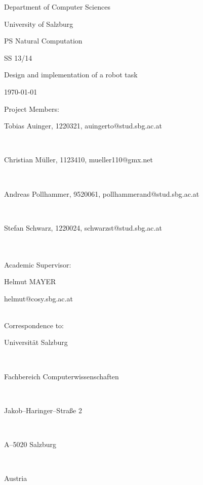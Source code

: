 \documentclass[12pt,fleqn,a4paper]{article}
\begin{document}
\begin{titlepage}%
\vspace{2cm}
\centerline{
\large{Department of Computer Sciences}}
\vspace{0.2cm}
\centerline{\large{University of Salzburg}}%
\vspace{2cm}

\centerline{\large{PS Natural Computation}}
\centerline{SS 13/14}
\vspace{1cm}

\centerline{\Large{Design and implementation of a robot task}}
\vspace{1cm}

\vspace{0.4cm}%
\centerline{\today}
\vspace{5cm}%

\vspace{0.2cm}
Project Members:\\
\centerline{Tobias Auinger, 1220321, auingerto@stud.sbg.ac.at}\\
\centerline{Christian M\"{u}ller, 1123410, mueller110@gmx.net}\\
\centerline{Andreas Pollhammer, 9520061, pollhammerand@stud.sbg.ac.at}\\
\centerline{Stefan Schwarz, 1220024, schwarzst@stud.sbg.ac.at}\\
\vspace {0.8cm}\\

Academic Supervisor: \\
\centerline{Helmut MAYER}
\centerline{helmut@cosy.sbg.ac.at}
\vspace{0.8cm}\\
Correspondence to: \\
\centerline{Universit\"{a}t Salzburg} \\
\centerline{Fachbereich Computerwissenschaften} \\
\centerline{Jakob--Haringer--Stra\ss e 2} \\
\centerline{A--5020 Salzburg} \\
\centerline{Austria}
\clearpage
\end{titlepage}



\end{document}
